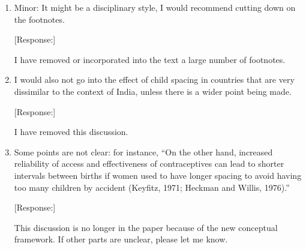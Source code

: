 \documentclass[letterpaper,12pt]{article}
\begin{document}
\begin{enumerate}
\item Minor: It might be a disciplinary style, I would recommend cutting down
on the footnotes. 

[Response:]

I have removed or incorporated into the text a large number of footnotes.


\item I would also not go into the effect of child spacing
in countries that are very dissimilar to the context of India, unless
there is a wider point being made. 

[Response:]

I have removed this discussion.


\item Some points are not clear: for
instance, “On the other hand, increased reliability of access and
effectiveness of contraceptives can lead to shorter intervals between
births if women used to have longer spacing to avoid having too many
children by accident (Keyfitz, 1971; Heckman and Willis, 1976).”

[Response:]

This discussion is no longer in the paper because of the new conceptual
framework. If other parts are unclear, please let me know.

\end{enumerate}


\newpage


\end{document}
